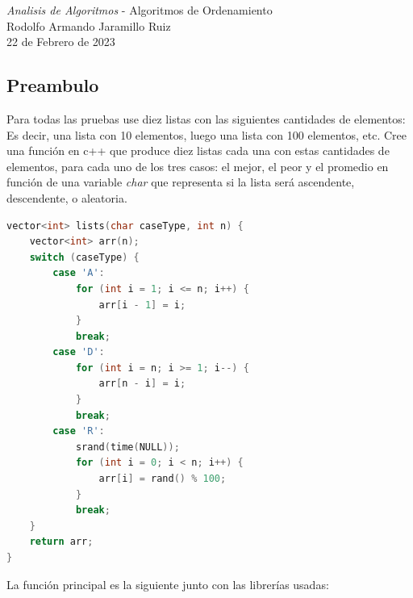 \documentclass[14pt,a4paper]{report}
\begin{document}
\newcommand{\commentedbox}[2]{%
  \mbox{
    \begin{tabular}[t]{@{}c@{}}
    $\boxed{\displaystyle#1}$\\
    #2
    \end{tabular}%
  }%
}
\pagestyle{fancy}
\Large{\textit{Analisis de Algoritmos} - Algoritmos de Ordenamiento}\\
\normalsize
Rodolfo Armando Jaramillo Ruiz\\
22 de Febrero de 2023\\
\subsection*{Preambulo}
\quad Para todas las pruebas use diez listas con las siguientes cantidades de elementos:
\begin{equation*}
	[10, 100, 250, 500, 750, 1000, 2500, 5000, 7500, 10000]
\end{equation*}
Es decir, una lista con 10 elementos, luego una lista con 100 elementos, etc.
Cree una función en c++ que produce diez listas cada una con estas cantidades de elementos, para cada uno de los tres casos: el mejor, el peor y el promedio en función de una variable \textit{char} que representa si la lista será ascendente, descendente, o aleatoria.
\begin{lstlisting}[language=C++]
vector<int> lists(char caseType, int n) {
    vector<int> arr(n);
    switch (caseType) {
        case 'A':
            for (int i = 1; i <= n; i++) {
                arr[i - 1] = i;
            }
            break;
        case 'D':
            for (int i = n; i >= 1; i--) {
                arr[n - i] = i;
            }
            break;
        case 'R':
            srand(time(NULL));
            for (int i = 0; i < n; i++) {
                arr[i] = rand() % 100;
            }
            break;
    }
    return arr;
}
\end{lstlisting}
\quad La función principal es la siguiente junto con las librerías usadas:
\end{document}
